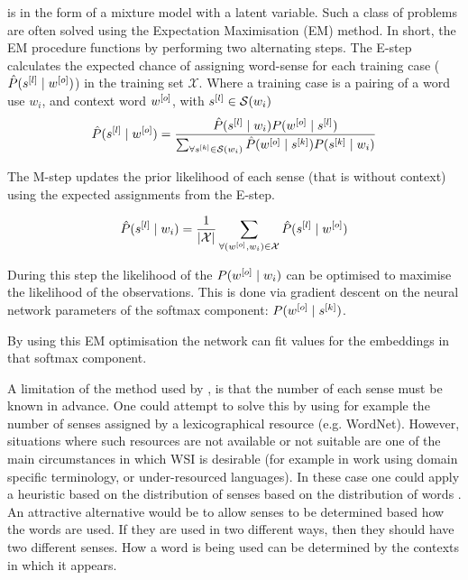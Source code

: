 \documentclass[12pt,parskip]{komatufte}
\begin{document}
 is in the form of a mixture model with a latent variable.
Such a class of problems are often solved using the Expectation Maximisation (EM) method.
In short, the EM procedure functions by performing two alternating steps.
The E-step calculates the expected chance of assigning word-sense for each training case ($\hat{P}(\n s_l \mid \n w_o)$) in the training set $\mathcal{X}$.
Where a training case is a pairing of a word use $w_i$, and context word $\n w_o$, with $\n s_l\in \seq S(w_i)$
\begin{align}
\hat{P}(\n s_l \mid \n w_o) = \frac{\hat{P}(\n s_l \mid w_i) P(\n w_o \mid \n s_l)}{\sum_{\forall \n s_k \in \seq S(w_i)} \hat{P}(\n w_o \mid \n s_k) P(\n s_k \mid w_i)}
\end{align}

The M-step updates the prior likelihood of each sense (that is without context) using the expected assignments from the E-step.

\begin{align}
\hat{P}(\n s_l \mid w_i) = \frac{1}{|\mathcal{X}|} \sum_{\forall (\n w_o,w_i)\in \mathcal{X}} \hat{P}(\n s_l \mid \n w_o)
\end{align}

During this step the likelihood of the $P(\n w_o \mid w_i)$ can be optimised to maximise the likelihood of the observations.
This is done via gradient descent on the neural network parameters of the softmax component: $P(\n w_o \mid \n s_k)$.

By using this EM optimisation the network can fit values for the embeddings in that softmax component.


A limitation of the method used by , is that the number of each sense must be known in advance.
One could attempt to solve this by using for example the number of senses assigned by a lexicographical resource (e.g. WordNet).
However, situations where such resources are not available or not suitable are one of the main circumstances in which WSI is desirable  (for example in work using domain specific terminology, or under-resourced languages).
In these case one could apply a heuristic based on the distribution of senses based on the distribution of words \parencite{zipf1945meaning}.
An attractive alternative would be to allow senses to be determined based how the words are used. If they are used in two different ways, then they should have two different senses.
How a word is being used can be determined by the contexts in which it appears.
\end{document}
